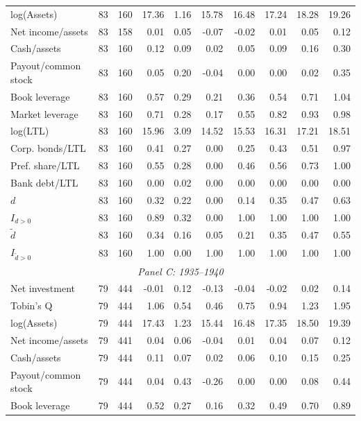 \begin{threeparttable}
\begin{tabular}{lrrrrrrrrr}
log(Assets) & 83 & 160 & 17.36 & 1.16 & 15.78 & 16.48 & 17.24 & 18.28 & 19.26 \\
Net income/assets & 83 & 158 & 0.01 & 0.05 & -0.07 & -0.02 & 0.01 & 0.05 & 0.12 \\
Cash/assets & 83 & 160 & 0.12 & 0.09 & 0.02 & 0.05 & 0.09 & 0.16 & 0.30 \\
Payout/common stock & 83 & 160 & 0.05 & 0.20 & -0.04 & 0.00 & 0.00 & 0.02 & 0.35 \\
Book leverage & 83 & 160 & 0.57 & 0.29 & 0.21 & 0.36 & 0.54 & 0.71 & 1.04 \\
Market leverage & 83 & 160 & 0.71 & 0.28 & 0.17 & 0.55 & 0.82 & 0.93 & 0.98 \\
log(LTL) & 83 & 160 & 15.96 & 3.09 & 14.52 & 15.53 & 16.31 & 17.21 & 18.51 \\
Corp. bonds/LTL & 83 & 160 & 0.41 & 0.27 & 0.00 & 0.25 & 0.43 & 0.51 & 0.97 \\
Pref. share/LTL & 83 & 160 & 0.55 & 0.28 & 0.00 & 0.46 & 0.56 & 0.73 & 1.00 \\
Bank debt/LTL & 83 & 160 & 0.00 & 0.02 & 0.00 & 0.00 & 0.00 & 0.00 & 0.00 \\
\ensuremath{d} & 83 & 160 & 0.32 & 0.22 & 0.00 & 0.14 & 0.35 & 0.47 & 0.63 \\
\ensuremath{I_{d>0}} & 83 & 160 & 0.89 & 0.32 & 0.00 & 1.00 & 1.00 & 1.00 & 1.00 \\
\ensuremath{\tilde{d}} & 83 & 160 & 0.34 & 0.16 & 0.05 & 0.21 & 0.35 & 0.47 & 0.55 \\
\ensuremath{I_{\tilde{d}>0}} & 83 & 160 & 1.00 & 0.00 & 1.00 & 1.00 & 1.00 & 1.00 & 1.00 \\
\midrule
\multicolumn{10}{c}{\textit{Panel C: 1935--1940}} \\
\midrule
Net investment & 79 & 444 & -0.01 & 0.12 & -0.13 & -0.04 & -0.02 & 0.02 & 0.14 \\
Tobin's Q & 79 & 444 & 1.06 & 0.54 & 0.46 & 0.75 & 0.94 & 1.23 & 1.95 \\
log(Assets) & 79 & 444 & 17.43 & 1.23 & 15.44 & 16.48 & 17.35 & 18.50 & 19.39 \\
Net income/assets & 79 & 441 & 0.04 & 0.06 & -0.04 & 0.01 & 0.04 & 0.07 & 0.12 \\
Cash/assets & 79 & 444 & 0.11 & 0.07 & 0.02 & 0.06 & 0.10 & 0.15 & 0.25 \\
Payout/common stock & 79 & 444 & 0.04 & 0.43 & -0.26 & 0.00 & 0.00 & 0.08 & 0.44 \\
Book leverage & 79 & 444 & 0.52 & 0.27 & 0.16 & 0.32 & 0.49 & 0.70 & 0.89 \\

\end{tabular}
\end{threeparttable}
